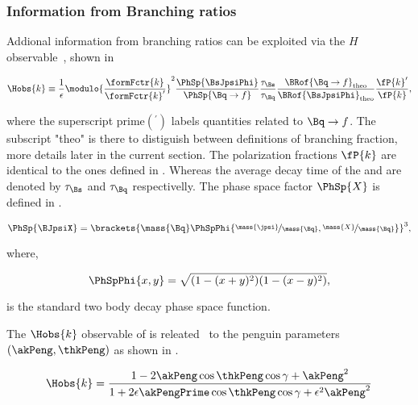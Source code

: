 \subsubsection{Information from Branching ratios}
Addional information from branching ratios can be exploited via the $H$ observable~\cite{Fleischer:1999zi}, shown in 

\begin{equation}
\centering
  \Hobs{k} \equiv   \frac{1}{\epsilon}
            \modulo{\frac{\formFctr{k}}{\formFctr{k}'}}^2
                    \frac{\PhSp{\BsJpsiPhi}} {\PhSp{\Bq\to f}}
                    \frac{\tau_{\Bs}}{\tau_{\Bq}}
                    \frac{\BRof{\Bq\to f}_{\rm theo}}{\BRof{\BsJpsiPhi}_{\rm theo}}
                    \frac{\fP{k}'}{{\fP{k}}},
\label{hobs_def}
\end{equation}

\noindent where the superscript prime$({}^\prime)$ labels quantities related to $\Bq\to f$. The subscript "theo" is there
to distiguish between definitions of branching fraction, more details later in the current section.
The polarization fractions $\fP{k}$ are identical to the ones defined in .
Whereas the average decay time of the \Bs and \Bq are denoted by $\tau_{\Bs}$ and $\tau_{\Bq}$
respectivelly. The phase space factor $\PhSp{X}$ is defined in .

\begin{equation}
\centering
   \PhSp{\BJpsiX}  = \brackets{ \mass{\Bq} \PhSpPhi{ \nicefrac{\mass{\jpsi}}{\mass{\Bq}}, \nicefrac{\mass{X}}{\mass{\Bq}}  } }^3,
\label{phase_space_eq_def}
\end{equation}

\noindent where,

\begin{equation}
\centering
   \PhSpPhi{x,y} = \sqrt{ (1-(x+y)^2)(1-(x-y)^2) },
\label{phase_space_phi_eq_def}
\end{equation}

\noindent is the standard two body decay phase space function.

The $\Hobs{k}$ observable of  is releated~\cite{Fleischer:1999zi}
to the penguin parameters $(\akPeng,\thkPeng)$ as shown in .

\begin{equation}
\centering
  \Hobs{k} = \frac{1-2\akPeng\cos\thkPeng\cos\gamma + \akPeng^2}{1+2\epsilon\akPengPrime\cos\thkPeng\cos\gamma + \epsilon^2\akPeng^2}
\label{Hobs_peng_param}
\end{equation}

